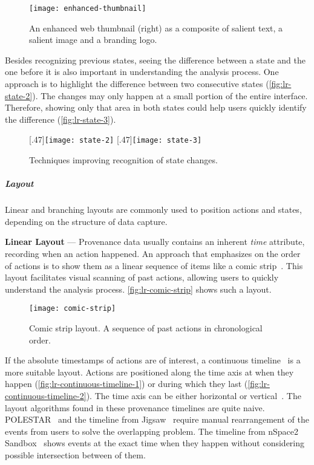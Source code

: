 \begin{figure}[!htb]
	\centering
	\texttt{[image: enhanced-thumbnail]}
	\caption[An enhanced web thumbnail]{An enhanced web thumbnail (right) as a composite of salient text, a salient image and a branding logo. }
	\label{fig:lr-enhanced-thumbnail}
\end{figure}

Besides recognizing previous states, seeing the difference between a state and the one before it is also important in understanding the analysis process. One approach is to highlight the difference between two consecutive states (\autoref{fig:lr-state-2}). The changes may only happen at a small portion of the entire interface. Therefore, showing only that area in both states could help users quickly identify the difference (\autoref{fig:lr-state-3}).

\begin{figure}[!htb]
\centering
{}[.47\columnwidth]{\texttt{[image: state-2]}} 
\hfill
{}[.47\columnwidth]{\texttt{[image: state-3]}}
\caption{Techniques improving recognition of state changes.}
\end{figure}

\subparagraph{Layout} Linear and branching layouts are commonly used to position actions and states, depending on the structure of data capture.

\textbf{Linear Layout} --- Provenance data usually contains an inherent \emph{time} attribute, recording when an action happened. An approach that emphasizes on the order of actions is to show them as a linear sequence of items like a comic strip~\cite{Kurlander1988,Meng1998}. This layout facilitates visual scanning of past actions, allowing users to quickly understand the analysis process. \autoref{fig:lr-comic-strip} shows such a layout.

\begin{figure}[!htb]
	\centering
	\texttt{[image: comic-strip]}
	\caption[Comic strip layout]{Comic strip layout. A sequence of past actions in chronological order. }
	\label{fig:lr-comic-strip}
\end{figure}

If the absolute timestamps of actions are of interest, a continuous timeline~\cite{Derthick2001} is a more suitable layout. Actions are positioned along the time axis at when they happen (\autoref{fig:lr-continuous-timeline-1}) or during which they last (\autoref{fig:lr-continuous-timeline-2}). The time axis can be either horizontal or vertical~\cite{SandboxTimeline2012}. The layout algorithms found in these provenance timelines are quite naive. POLESTAR~\cite{Pioch2006} and the timeline from Jigsaw~\cite{Liu2010} require manual rearrangement of the events from users to solve the overlapping problem. The timeline from nSpace2 Sandbox~\cite{SandboxTimeline2012} shows events at the exact time when they happen without considering possible intersection between of them.

